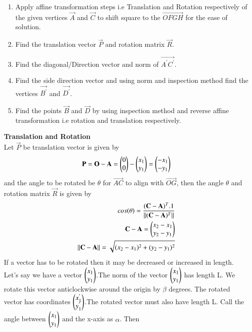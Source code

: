\documentclass[journal,12pt,twocolumn]{IEEEtran}
\begin{document}
\begin{enumerate}
	\item Apply affine transformation steps i.e Translation and Rotation respectively of the given vertices $\vec{A}$ and $\vec{C}$ to shift square to the $\vec{OFGH}$ for the ease of solution. 
	\item Find the translation vector $\vec{P}$ and rotation matrix $\vec{R}$.
    \item Find the diagonal/Direction vector and norm of $\vec{A^{'}C^{'}}$.
    \item Find the side direction vector and using norm and inspection method find the vertices $\vec{B^{'}}$ and $\vec{D^{'}}$.
    \item Find the points $\vec{B}$ and $\vec{D}$ by using inspection method and reverse affine transformation i.e rotation and translation respectively.
\end{enumerate}
\textbf{Translation and Rotation}
\\
Let $\vec{P}$ be translation vector is given by 
\begin{align}
\begin{split}
\mathbf{P} = \mathbf{O}-\mathbf{A} = \begin{pmatrix}0\\0\end{pmatrix}-\begin{pmatrix}x_1\\y_1\end{pmatrix}=\begin{pmatrix}-x_1\\-y_1\end{pmatrix}
\end{split}
\end{align}
and the angle to be rotated be $\theta$ for $\vec{AC}$ to align with $\vec{OG}$, then the angle $\theta$ and rotation matrix $\vec{R}$ is given by
\begin{align}
\begin{split}
cos(\theta) = \frac{(\mathbf{C}-\mathbf{A})^T.1}{||(\mathbf{C}-\mathbf{A})^T||}\\
\mathbf{C}-\mathbf{A} = \begin{pmatrix}x_2-x_1\\y_2-y_1\end{pmatrix}\\
||\mathbf{C}-\mathbf{A}|| = \sqrt{(x_2-x_1)^2+(y_2-y_1)^2}\\
\end{split}
\end{align}
If a vector has to be rotated then it may be decreased or increased in length.
Let’s say we have a vector $\begin{pmatrix}x_1\\y_1\end{pmatrix}$.The norm of the vector $\begin{pmatrix}x_1\\y_1\end{pmatrix}$ has length L.
We rotate this vector anticlockwise around the origin by $\beta$ degrees. The rotated vector has coordinates $\begin{pmatrix}x_1^{'}\\y_1^{'}\end{pmatrix}$.The rotated vector must also have length L. Call the angle between  $\begin{pmatrix}x_1\\y_1\end{pmatrix}$ and the x-axis as $\alpha$. Then
\end{document}
